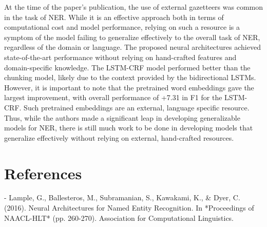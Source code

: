 \documentclass[11pt]{article}
\begin{document}
At the time of the paper's
publication, the use of external gazetteers was common in the 
task of NER. While it is an effective approach
both in terms of computational cost and model performance, 
relying on such a resource is a symptom
of the model failing to generalize effectively to the overall
task of NER, regardless of the domain or language.
The proposed neural architectures achieved
state-of-the-art performance without relying on hand-crafted features and
domain-specific knowledge. The LSTM-CRF model performed better than
the chunking model, likely due to the
context provided by the bidirectional LSTMs.
However, it is important to note that the
pretrained word embeddings gave the largest improvement,
with overall performance of +7.31 in F1 for the LSTM-CRF. 
Such pretrained embeddings are an external, 
language specific resource. Thus, while
the authors made a significant leap
in developing generalizable models
for NER, there is still much work to be done
in developing models that generalize effectively
without relying on external, hand-crafted resources.

\section*{References}
- Lample, G., Ballesteros, M., Subramanian, S., Kawakami, K., \& Dyer, C. (2016). Neural Architectures for Named Entity Recognition. In *Proceedings of NAACL-HLT* (pp. 260-270). Association for Computational Linguistics.
\end{document}
